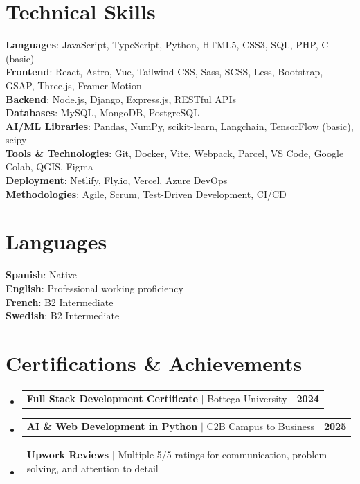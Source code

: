 \documentclass[letterpaper,11pt]{article}
\makeatletter
\newcommand{\resumeProjectHeading}[2]{
    \item
    \begin{tabular*}{1.001\textwidth}{l@{\extracolsep{\fill}}r}
      \small#1 & \textbf{\small #2}\\
    \end{tabular*}\vspace{-7pt}
}
\newcommand{\resumeSubHeadingListStart}{\begin{itemize}[leftmargin=0.0in, label={}]}
\newcommand{\resumeSubHeadingListEnd}{\end{itemize}}
\makeatother
\begin{document}
\section{Technical Skills}
 \begin{itemize}[leftmargin=0.15in, label={}]
    \small{\item{
     \textbf{Languages}{: JavaScript, TypeScript, Python, HTML5, CSS3, SQL, PHP, C (basic)} \\
     \textbf{Frontend}{: React, Astro, Vue, Tailwind CSS, Sass, SCSS, Less, Bootstrap, GSAP, Three.js, Framer Motion} \\
     \textbf{Backend}{: Node.js, Django, Express.js, RESTful APIs} \\
     \textbf{Databases}{: MySQL, MongoDB, PostgreSQL} \\
     \textbf{AI/ML Libraries}{: Pandas, NumPy, scikit-learn, Langchain, TensorFlow (basic), scipy} \\
     \textbf{Tools \& Technologies}{: Git, Docker, Vite, Webpack, Parcel, VS Code, Google Colab, QGIS, Figma} \\
     \textbf{Deployment}{: Netlify, Fly.io, Vercel, Azure DevOps} \\
     \textbf{Methodologies}{: Agile, Scrum, Test-Driven Development, CI/CD}
    }}
 \end{itemize}
 \vspace{-16pt}

\section{Languages}
 \begin{itemize}[leftmargin=0.15in, label={}]
    \small{\item{
     \textbf{Spanish}{: Native} \\
     \textbf{English}{: Professional working proficiency} \\
     \textbf{French}{: B2 Intermediate} \\
     \textbf{Swedish}{: B2 Intermediate} \\
    }}
 \end{itemize}
 \vspace{-16pt}

\section{Certifications \& Achievements}
    \resumeSubHeadingListStart
      \resumeProjectHeading
          {\textbf{Full Stack Development Certificate} $|$ Bottega University}{2024}
      \resumeProjectHeading
          {\textbf{AI \& Web Development in Python} $|$ C2B Campus to Business}{2025}
      \resumeProjectHeading
          {\textbf{Upwork Reviews} $|$ Multiple 5/5 ratings for communication, problem-solving, and attention to detail}{}
    \resumeSubHeadingListEnd
\end{document}

